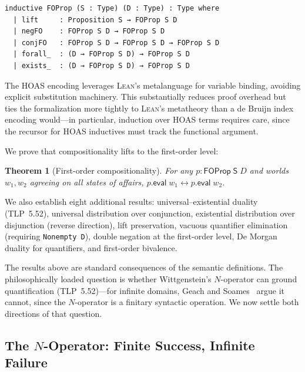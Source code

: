 \documentclass[jsl,bibother]{asl}
\newtheorem{theorem}{Theorem}[section]
\theoremstyle{definition}
\theoremstyle{remark}
\newcommand{\Sach}{\mathsf{S}}
\newcommand{\eval}{\mathsf{eval}}
\newcommand{\Lean}{\textsc{Lean}}
\begin{document}
\begin{lstlisting}
inductive FOProp (S : Type) (D : Type) : Type where
  | lift     : Proposition S → FOProp S D
  | negFO    : FOProp S D → FOProp S D
  | conjFO   : FOProp S D → FOProp S D → FOProp S D
  | forall_  : (D → FOProp S D) → FOProp S D
  | exists_  : (D → FOProp S D) → FOProp S D
\end{lstlisting}

\noindent
The HOAS encoding leverages \Lean's metalanguage for variable
binding, avoiding explicit substitution machinery.  This
substantially reduces proof overhead but ties the formalization
more tightly to \Lean's metatheory than a de Bruijn index
encoding would---in particular, induction over HOAS terms
requires care, since the recursor for HOAS inductives must track
the functional argument.

We prove that compositionality lifts to the first-order level:

\begin{theorem}[First-order compositionality]
\label{thm:fo-comp}
For any $p : \mathsf{FOProp}\;\Sach\;D$ and worlds $w_1, w_2$
agreeing on all states of affairs, $p.\eval\;w_1 \leftrightarrow
p.\eval\;w_2$.
\end{theorem}

\noindent
We also establish eight additional results: universal--existential
duality (TLP~5.52), universal distribution over conjunction,
existential distribution over disjunction (reverse direction),
lift preservation, vacuous quantifier elimination (requiring
\texttt{Nonempty D}), double negation at the first-order level,
De Morgan duality for quantifiers, and first-order bivalence.

The results above are standard consequences of the semantic
definitions.  The philosophically loaded question is whether
Wittgenstein's $N$-operator can ground quantification
(TLP~5.52)---for infinite domains, Geach and
Soames~\cite{geach1981,soames1983} argue it cannot, since the
$N$-operator is a finitary syntactic operation.  We now settle
both directions of that question.

\subsection{The \texorpdfstring{$N$}{N}-Operator: Finite Success, Infinite Failure}
\label{sec:noperator}
\end{document}
